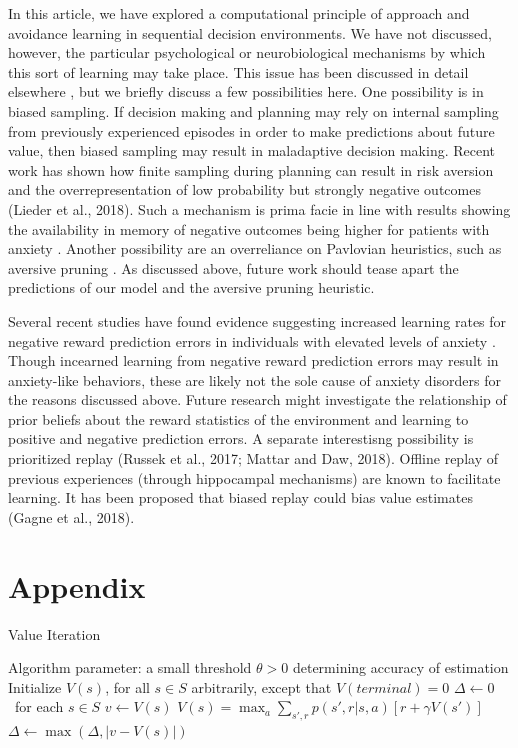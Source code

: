 \documentclass[11pt]{article} %
\begin{document}
In this article, we have explored a computational principle of approach and avoidance learning in sequential decision environments. We have not discussed, however, the particular psychological or neurobiological mechanisms by which this sort of learning may take place. This issue has been discussed in detail elsewhere \citep{Bishop2018}, but we briefly discuss a few possibilities here. One possibility is in biased sampling. If decision making and planning may rely on internal sampling from previously experienced episodes in order to make predictions about future value, then biased sampling may result in maladaptive decision making. Recent work has shown how finite sampling during planning can result in risk aversion and the overrepresentation of low probability but strongly negative outcomes (Lieder et al., 2018). Such a mechanism is prima facie in line with results showing the availability in memory of negative outcomes being higher for patients with anxiety \citep{Borkovec1999, Miranda2007}. Another possibility are an overreliance on Pavlovian heuristics, such as aversive pruning \citep{Huys2012,Lally2017}. As discussed above, future work should tease apart the predictions of our model and the aversive pruning heuristic.

Several recent studies have found evidence suggesting increased learning rates for negative reward prediction errors in individuals with elevated levels of anxiety \citep{Harle2017, Garrett2018, Aylward2019}. Though incearned learning from negative reward prediction errors may result in anxiety-like behaviors, these are likely not the sole cause of anxiety disorders for the reasons discussed above. Future research might investigate the relationship of prior beliefs about the reward statistics of the environment and learning to positive and negative prediction errors. A separate interestisng possibility is prioritized replay (Russek et al., 2017; Mattar and Daw, 2018). Offline replay of previous experiences (through hippocampal mechanisms) are known to facilitate learning. It has been proposed that biased replay could bias value estimates (Gagne et al., 2018).




\section{Appendix}

\begin{algorithm}
  \caption{Value Iteration}

  \State Algorithm parameter: a small threshold $\theta > 0$ determining accuracy of estimation
  \State Initialize $V(s)$, for all $s \in S$ arbitrarily, except that $V(terminal) = 0$
  \State
  \While{$\Delta > \theta$}
    \State $\Delta \leftarrow 0$
    \Loop \ for each $s \in S$
      \State $v \leftarrow V(s)$
      \State $ V(s) = \max_a \sum_{s',r} p(s',r|s,a) \left[ r + \gamma V(s') \right] $
      \State $\Delta \leftarrow \max(\Delta, |v - V(s)|)$
    \EndLoop
  \EndWhile

\end{algorithm}
\end{document}
